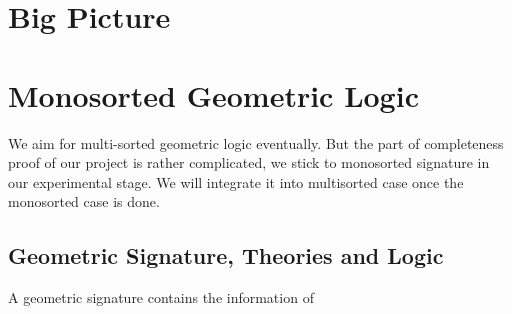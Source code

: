 %


\chapter{Big Picture}

\chapter{Monosorted Geometric Logic}
We aim for multi-sorted geometric logic eventually. But the part of completeness proof of our project is rather complicated, we stick to 
monosorted signature in our experimental stage. We will integrate it into multisorted case once the monosorted case is done.

\section{Geometric Signature, Theories and Logic}

\begin{definition}
A geometric signature contains the information of 
\end{definition}


\newcommand{\thT}{\ensuremath{\mathcal{T}}}
\newcommand{\fmlInCtx}[2]{\{ #1 | #2 \}}
\newcommand{\subs}[2]{{#1}[{#1}]}
\newcommand{\Univ}{\ensuremath{\mathscr{U}}}
\newcommand{\quot}{\text{quot}}
\newcommand{\vxz}{\vec{x}+\vec{z}}
\newcommand{\vw}{\vec{w}}
\newcommand{\vx}{\vec{x}}
\newcommand{\vy}{\vec{y}}
\newcommand{\vz}{\vec{z}}
\newcommand{\iotas}{\ensuremath{[\iota_1,\iota_2]}}
\newcommand{\xphi}{\fmlInCtx{\vec{x}}{\phi}}
\newcommand{\ypsi}{\fmlInCtx{\vec{y}}{\psi}}
\newcommand{\zzeta}{\fmlInCtx{\vec{z}}{\zeta}}
\newcommand{\ophi}{\overline{\phi}}
\newcommand{\opsi}{\overline{\psi}}
\newcommand{\ozeta}{\overline{\zeta}}
\newcommand{\inl}{\mathsf{inl}}
\newcommand{\inr}{\mathsf{inr}}

